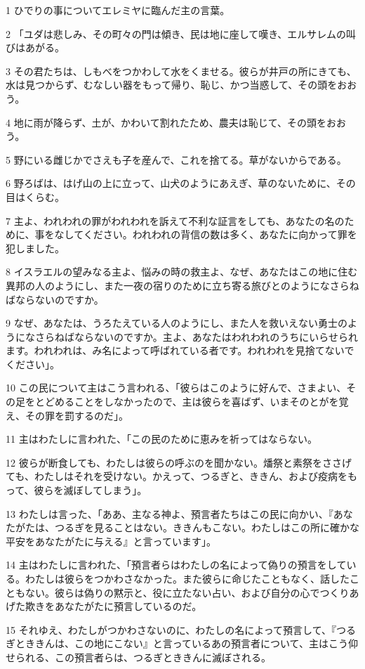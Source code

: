 \par 1 ひでりの事についてエレミヤに臨んだ主の言葉。
\par 2 「ユダは悲しみ、その町々の門は傾き、民は地に座して嘆き、エルサレムの叫びはあがる。
\par 3 その君たちは、しもべをつかわして水をくませる。彼らが井戸の所にきても、水は見つからず、むなしい器をもって帰り、恥じ、かつ当惑して、その頭をおおう。
\par 4 地に雨が降らず、土が、かわいて割れたため、農夫は恥じて、その頭をおおう。
\par 5 野にいる雌じかでさえも子を産んで、これを捨てる。草がないからである。
\par 6 野ろばは、はげ山の上に立って、山犬のようにあえぎ、草のないために、その目はくらむ。
\par 7 主よ、われわれの罪がわれわれを訴えて不利な証言をしても、あなたの名のために、事をなしてください。われわれの背信の数は多く、あなたに向かって罪を犯しました。
\par 8 イスラエルの望みなる主よ、悩みの時の救主よ、なぜ、あなたはこの地に住む異邦の人のようにし、また一夜の宿りのために立ち寄る旅びとのようになさらねばならないのですか。
\par 9 なぜ、あなたは、うろたえている人のようにし、また人を救いえない勇士のようになさらねばならないのですか。主よ、あなたはわれわれのうちにいらせられます。われわれは、み名によって呼ばれている者です。われわれを見捨てないでください」。
\par 10 この民について主はこう言われる、「彼らはこのように好んで、さまよい、その足をとどめることをしなかったので、主は彼らを喜ばず、いまそのとがを覚え、その罪を罰するのだ」。
\par 11 主はわたしに言われた、「この民のために恵みを祈ってはならない。
\par 12 彼らが断食しても、わたしは彼らの呼ぶのを聞かない。燔祭と素祭をささげても、わたしはそれを受けない。かえって、つるぎと、ききん、および疫病をもって、彼らを滅ぼしてしまう」。
\par 13 わたしは言った、「ああ、主なる神よ、預言者たちはこの民に向かい、『あなたがたは、つるぎを見ることはない。ききんもこない。わたしはこの所に確かな平安をあなたがたに与える』と言っています」。
\par 14 主はわたしに言われた、「預言者らはわたしの名によって偽りの預言をしている。わたしは彼らをつかわさなかった。また彼らに命じたこともなく、話したこともない。彼らは偽りの黙示と、役に立たない占い、および自分の心でつくりあげた欺きをあなたがたに預言しているのだ。
\par 15 それゆえ、わたしがつかわさないのに、わたしの名によって預言して、『つるぎとききんは、この地にこない』と言っているあの預言者について、主はこう仰せられる、この預言者らは、つるぎとききんに滅ぼされる。
